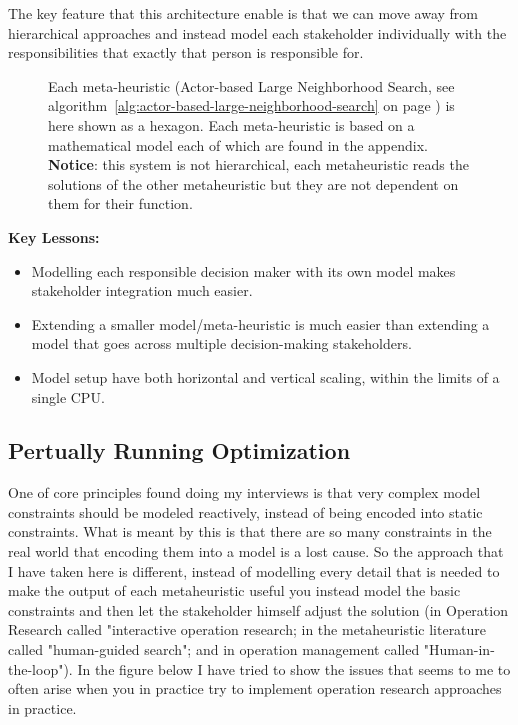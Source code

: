 The key feature that this architecture enable is that we can move away from hierarchical approaches and 
instead model each stakeholder individually with the responsibilities that exactly that person is responsible 
for. 

\begin{figure}[H]
	
	\centering
	\drawModelSetupHexagon
	\caption{
		Each meta-heuristic (Actor-based Large Neighborhood Search, see algorithm~\ref{alg:actor-based-large-neighborhood-search} on page \pageref{alg:actor-based-large-neighborhood-search}) is here shown as a hexagon.
		Each meta-heuristic is based on a mathematical model each of which are found in the appendix. \textbf{Notice}: this system is not 
		hierarchical, each metaheuristic reads the solutions of the other metaheuristic but they are not dependent on them for their 
		function.
	}
\end{figure}

\textbf{Key Lessons:}
\begin{itemize}
	\item Modelling each responsible decision maker with its own model makes stakeholder integration much easier.
	\item Extending a smaller model/meta-heuristic is much easier than extending a model that goes across multiple decision-making stakeholders.
	\item Model setup have both horizontal and vertical scaling, within the limits of a single CPU. 
\end{itemize}


\subsection*{Pertually Running Optimization}
One of core principles found doing my interviews is that very complex model constraints should be modeled reactively, instead 
of being encoded into static constraints. What is meant by this is that there are so many constraints in the real world that 
encoding them into a model is a lost cause. So the approach that I have taken here is different, instead of modelling every
detail that is needed to make the output of each metaheuristic useful you instead model the basic constraints and then let 
the stakeholder himself adjust the solution (in Operation Research called "interactive operation research; in the metaheuristic literature called
"human-guided search"; and in operation management called "Human-in-the-loop"). In the figure below I have tried to show the issues 
that seems to me to often arise when you in practice try to implement operation research approaches in practice.

